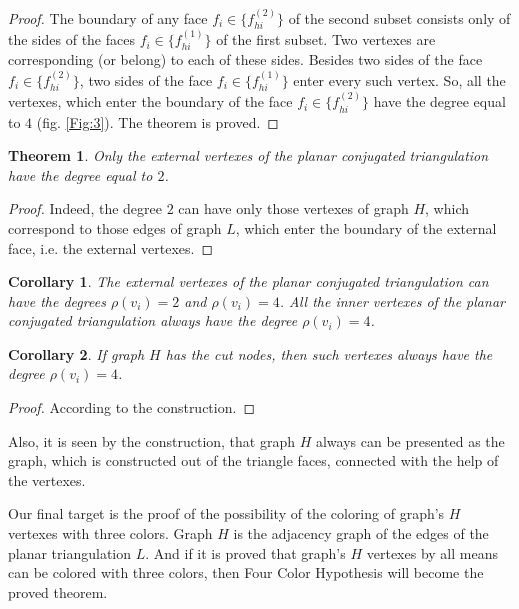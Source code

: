 \documentclass{amsart}
\newtheorem{theorem}{Theorem}
\theoremstyle{plain}
\newtheorem{corollary}{Corollary}
\numberwithin{equation}{section}
\begin{document}
\begin {proof}
The boundary of any face $f_i \in \{f_{hi}^{(2)}\}$ of the second subset consists only of the sides of the faces $f_i \in \{f_{hi}^{(1)}\}$ of the first subset. Two vertexes are corresponding (or belong) to each of these sides. Besides two sides of the face $f_i \in \{f_{hi}^{(2)}\}$, two sides of the face $f_i \in \{f_{hi}^{(1)}\}$ enter every such vertex. So, all the vertexes, which enter the boundary of the face $f_i \in \{f_{hi}^{(2)}\}$ have the degree equal to $4$ (fig. \ref{Fig:3}). The theorem is proved.
\end {proof}

\begin{theorem}
Only the external vertexes of the planar conjugated triangulation have the degree equal to $2$.
\end {theorem}

\begin {proof}
Indeed, the degree $2$ can have only those vertexes of graph $H$, which correspond to those edges of graph $L$, which enter the boundary of the external face, i.e. the external vertexes.
\end {proof}

\begin{corollary}
The external vertexes of the planar conjugated triangulation can have the degrees $\rho(v_i)=2$ and $\rho(v_i)=4$. All the inner vertexes of the planar conjugated triangulation always have the degree $\rho(v_i)=4$.
\end {corollary}

\begin{corollary}
If graph $H$ has the cut nodes, then such vertexes always have the degree $\rho(v_i)=4$.
\end {corollary}

\begin {proof}
According to the construction.
\end {proof}

Also, it is seen by the construction, that graph $H$ always can be presented as the graph, which is constructed out of the triangle faces, connected with the help of the vertexes.

Our final target is the proof of the possibility of the coloring of graph's $H$ vertexes with three colors. Graph $H$ is the adjacency graph of the edges of the planar triangulation $L$. And if it is proved that graph's $H$ vertexes by all means can be colored with three colors, then Four Color Hypothesis will become the proved theorem.
\end{document}
